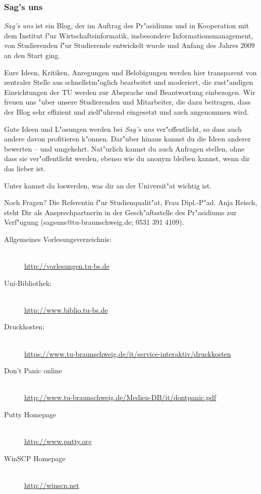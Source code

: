 \subsubsection*{Sag's uns}
\emph{Sag's uns} ist ein Blog, der im Auftrag des Pr"asidiums und in Kooperation mit dem Institut f"ur Wirtschaftsinformatik, insbesondere Informationsmanagement, von Studierenden f"ur Studierende entwickelt wurde und Anfang des Jahres 2009 an den Start ging.

Eure Ideen, Kritiken, Anregungen und Belobigungen werden hier transparent von zentraler Stelle aus schnellstm"oglich bearbeitet und moderiert, die zust"andigen Einrichtungen der TU werden zur Absprache und Beantwortung einbezogen. 
Wir freuen uns "uber unsere Studierenden und Mitarbeiter, die dazu beitragen, dass der Blog sehr effizient und zielf"uhrend eingesetzt und auch angenommen wird.

Gute Ideen und L"osungen werden bei \emph{Sag's uns} ver"offentlicht, so dass auch andere davon profitieren k"onnen.
Dar"uber hinaus kannst du die Ideen anderer bewerten – und umgekehrt. Nat"urlich kannst du auch Anfragen stellen, ohne dass sie ver"offentlicht werden, ebenso wie du anonym bleiben kannst, wenn dir das lieber ist.

Unter  kannst du loswerden, was dir an der Universit"at wichtig ist.

Noch Fragen? Die Referentin f"ur Studienqualit"at, Frau Dipl.-P"ad. Anja Reisch, steht Dir als Ansprechpartnerin in der Gesch"aftsstelle des Pr"asidiums zur Verf"ugung (sagsuns@tu-braunschweig.de; 0531 391 4109).

\begin{description}
\item[Allgemeines Vorlesungsverzeichnis:] ~\\
{\footnotesize\url{http://vorlesungen.tu-bs.de}}
\item[Uni-Bibliothek:] ~\\
{\footnotesize\url{http://www.biblio.tu-bs.de}}
\item[Druckkosten:] ~\\
{\footnotesize\url{https://www.tu-braunschweig.de/it/service-interaktiv/druckkosten}}
\item[Don't Panic online] ~\\
{\footnotesize\url{http://www.tu-braunschweig.de/Medien-DB/it/dontpanic.pdf}}
\item[Putty Homepage] ~\\
{\footnotesize\url{http://www.putty.org}}
\item[WinSCP Homepage] ~\\
{\footnotesize\url{http://winscp.net}}
\end{description}
